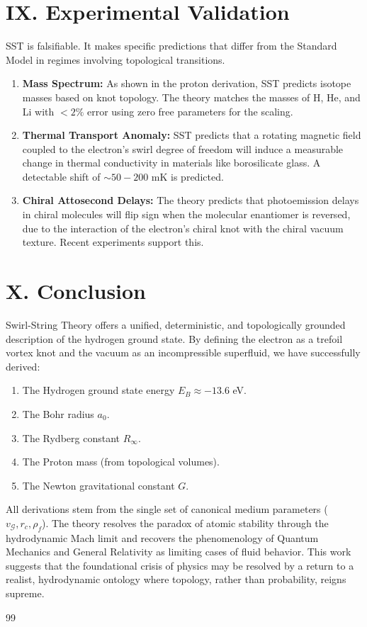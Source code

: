 \documentclass[11pt]{article}
\begin{document}
\section*{IX. Experimental Validation}
SST is falsifiable. It makes specific predictions that differ from the Standard Model in regimes involving topological transitions.
\begin{enumerate}
    \item \textbf{Mass Spectrum:} As shown in the proton derivation, SST predicts isotope masses based on knot topology. The theory matches the masses of H, He, and Li with $<2\%$ error using zero free parameters for the scaling.
    \item \textbf{Thermal Transport Anomaly:} SST predicts that a rotating magnetic field coupled to the electron's swirl degree of freedom will induce a measurable change in thermal conductivity in materials like borosilicate glass. A detectable shift of $\sim 50-200$ mK is predicted.
    \item \textbf{Chiral Attosecond Delays:} The theory predicts that photoemission delays in chiral molecules will flip sign when the molecular enantiomer is reversed, due to the interaction of the electron's chiral knot with the chiral vacuum texture. Recent experiments support this.
\end{enumerate}

\section*{X. Conclusion}
Swirl-String Theory offers a unified, deterministic, and topologically grounded description of the hydrogen ground state. By defining the electron as a trefoil vortex knot and the vacuum as an incompressible superfluid, we have successfully derived:
\begin{enumerate}
\item The Hydrogen ground state energy $E_B \approx -13.6$ eV.
\item The Bohr radius $a_0$.
\item The Rydberg constant $R_\infty$.
\item The Proton mass (from topological volumes).
\item The Newton gravitational constant $G$.
\end{enumerate}
All derivations stem from the single set of canonical medium parameters ($v_{\mathcal{G}}, r_c, \rho_f$). The theory resolves the paradox of atomic stability through the hydrodynamic Mach limit and recovers the phenomenology of Quantum Mechanics and General Relativity as limiting cases of fluid behavior. This work suggests that the foundational crisis of physics may be resolved by a return to a realist, hydrodynamic ontology where topology, rather than probability, reigns supreme.




        
        \begin{thebibliography}{99}



        \end{thebibliography}
\end{document}
